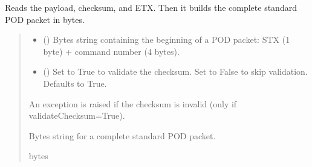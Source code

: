 \documentclass[letterpaper,10pt,english]{sphinxmanual}
\begin{document}
\begin{fulllineitems}
\begin{fulllineitems}
\label{\detokenize{BasicPodProtocol:BasicPodProtocol.POD_Basics._Read_Standard}}
\pysigstartsignatures
{}
\pysigstopsignatures
\sphinxAtStartPar
Reads the payload, checksum, and ETX. Then it builds the complete standard POD packet in bytes.
\begin{quote}\begin{description}
\begin{itemize}
\item {} 
\sphinxAtStartPar
{} () \textendash{} Bytes string containing the beginning of a POD packet: STX (1 byte)                 + command number (4 bytes).

\item {} 
\sphinxAtStartPar
{} (\sphinxstyleliteralemphasis{\sphinxupquote{, }}) \textendash{} Set to True to validate the checksum. Set to False to                 skip validation. Defaults to True.

\end{itemize}

\sphinxAtStartPar
{} \textendash{} An exception is raised if the checksum is invalid (only if validateChecksum=True).

\sphinxAtStartPar
Bytes string for a complete standard POD packet.

\sphinxAtStartPar
bytes

\end{description}\end{quote}

\end{fulllineitems}



\end{fulllineitems}
\end{document}

